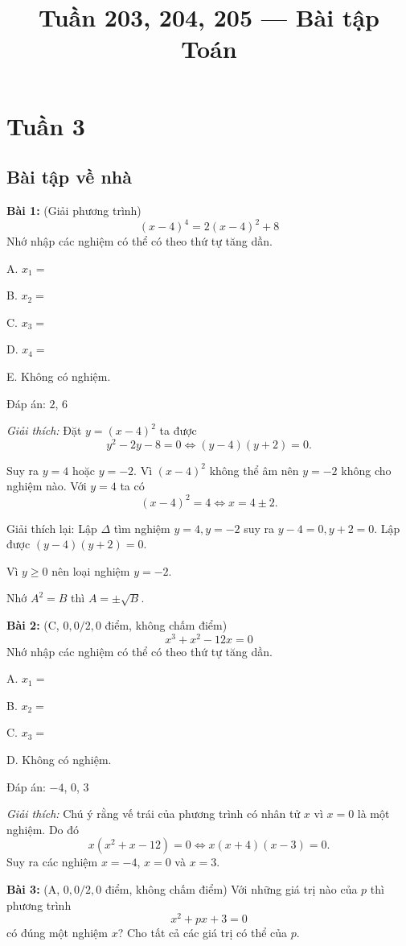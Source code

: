 \documentclass[12pt,a4paper]{article}
\title{Tuần 203, 204, 205 --- Bài tập Toán}
\author{}
\date{}
\begin{document}
\maketitle
\tableofcontents
\newpage

\section{Tuần 3}

\subsection{Bài tập về nhà}

\textbf{Bài 1:} (Giải phương trình)
\[
(x-4)^4 = 2(x-4)^2 + 8
\]
Nhớ nhập các nghiệm có thể có theo thứ tự tăng dần.

A. $x_1 =$

B. $x_2 =$

C. $x_3 =$

D. $x_4 =$

E. Không có nghiệm.

Đáp án: $2$, $6$

\textit{Giải thích:} Đặt $y = (x-4)^2$ ta được
\[
y^2 - 2y - 8 = 0 \iff (y-4)(y+2) = 0.
\]

Suy ra $y = 4$ hoặc $y = -2$. Vì $(x-4)^2$ không thể âm nên $y = -2$ không cho nghiệm nào. Với $y = 4$ ta có
\[
(x-4)^2 = 4 \iff x = 4 \pm 2.
\]

Giải thích lại: Lập $\Delta$ tìm nghiệm $y = 4, y = -2$ suy ra $y - 4 = 0, y + 2 = 0$. Lập được $(y-4)(y+2) = 0$.

Vì $y \ge 0$ nên loại nghiệm $y = -2$.

Nhớ $A^2 = B$ thì $A = \pm\sqrt{B}$.

\textbf{Bài 2:} (C, $0{,}0/2{,}0$ điểm, không chấm điểm)
\[
x^3 + x^2 - 12x = 0
\]
Nhớ nhập các nghiệm có thể có theo thứ tự tăng dần.

A. $x_1 =$

B. $x_2 =$

C. $x_3 =$

D. Không có nghiệm.

Đáp án: $-4$, $0$, $3$

\textit{Giải thích:} Chú ý rằng vế trái của phương trình có nhân tử $x$ vì $x = 0$ là một nghiệm. Do đó
\[
x(x^2 + x - 12) = 0 \iff x(x+4)(x-3) = 0.
\]
Suy ra các nghiệm $x = -4$, $x = 0$ và $x = 3$.

\textbf{Bài 3:} (A, $0{,}0/2{,}0$ điểm, không chấm điểm)
Với những giá trị nào của $p$ thì phương trình
\[
x^2 + px + 3 = 0
\]
có đúng một nghiệm $x$? Cho tất cả các giá trị có thể của $p$.
\end{document}
